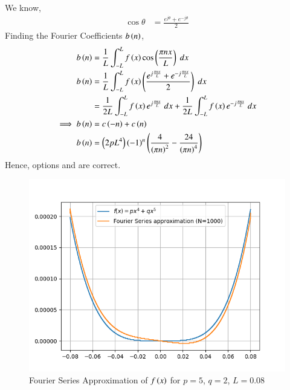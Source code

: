 \documentclass[journal,12pt,twocolumn]{IEEEtran}
\theoremstyle{remark}
\begin{document}
We know,
\begin{align}
    \cos\theta&=\frac{e^{j\theta}+e^{-j\theta}}{2}
\end{align}
Finding the Fourier Coefficients $b\left(n\right)$,
\begin{align}
    b\left(n\right)&=\frac{1}{L}\int_{-L}^{L}f\left(x\right)\cos\left(\frac{\pi nx}{L}\right)\;dx\\
    b\left(n\right)&=\frac{1}{L}\int_{-L}^{L}f\left(x\right)\left(\frac{e^{j\frac{\pi n x}{L}}+e^{-j\frac{\pi n x}{L}}}{2}\right)\;dx\\
    &=\frac{1}{2L}\int_{-L}^{L}f\left(x\right)e^{j\frac{\pi n x}{L}}\;dx+\frac{1}{2L}\int_{-L}^{L}f\left(x\right)e^{-j\frac{\pi n x}{L}}\;dx\\
    \implies b\left(n\right)&=c\left(-n\right)+c\left(n\right)\\
    b\left(n\right)&=\left(2pL^4\right)\left(-1\right)^n\left(\frac{4}{\left(\pi n\right)^2}-\frac{24}{\left(\pi n\right)^4}\right)
\end{align}
Hence, options  and  are correct.
\begin{figure}[h!]
    \centering
    \includegraphics[width=\linewidth]{figs/Figure_1.png}
    \caption{Fourier Series Approximation of $f\left(x\right)$ for $p=5$, $q=2$, $L=0.08$}
\end{figure}
\end{document}
